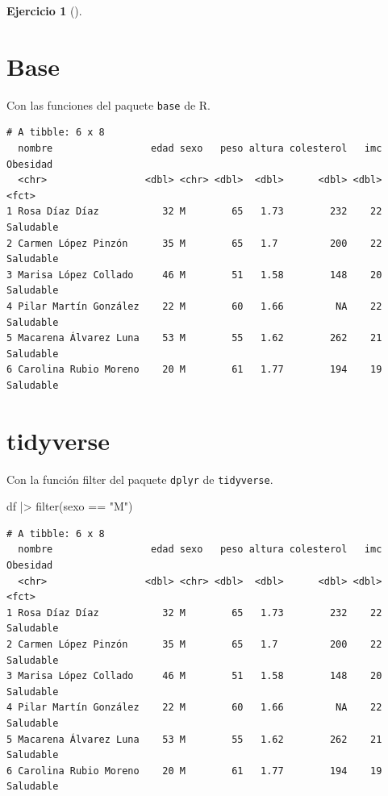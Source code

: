 \documentclass[
  spanish,
  a4paper,
]{scrreport}
\newenvironment{Shaded}{\begin{snugshade}}{\end{snugshade}}
\newcommand{\FunctionTok}[1]{\textcolor[rgb]{0.28,0.35,0.67}{#1}}
\newcommand{\NormalTok}[1]{\textcolor[rgb]{0.00,0.23,0.31}{#1}}
\newcommand{\SpecialCharTok}[1]{\textcolor[rgb]{0.37,0.37,0.37}{#1}}
\newcommand{\StringTok}[1]{\textcolor[rgb]{0.13,0.47,0.30}{#1}}
\theoremstyle{definition}
\newtheorem{exercise}{Ejercicio}[chapter]
\theoremstyle{remark}
\begin{document}
\begin{exercise}[]
\begin{enumerate}
\begin{tcolorbox}
  \section{Base}

  Con las funciones del paquete \texttt{base} de R.

\begin{Shaded}
\end{Shaded}

\begin{verbatim}
# A tibble: 6 x 8
  nombre                 edad sexo   peso altura colesterol   imc Obesidad 
  <chr>                 <dbl> <chr> <dbl>  <dbl>      <dbl> <dbl> <fct>    
1 Rosa Díaz Díaz           32 M        65   1.73        232    22 Saludable
2 Carmen López Pinzón      35 M        65   1.7         200    22 Saludable
3 Marisa López Collado     46 M        51   1.58        148    20 Saludable
4 Pilar Martín González    22 M        60   1.66         NA    22 Saludable
5 Macarena Álvarez Luna    53 M        55   1.62        262    21 Saludable
6 Carolina Rubio Moreno    20 M        61   1.77        194    19 Saludable
\end{verbatim}

  \section{tidyverse}

  Con la función filter del paquete \texttt{dplyr} de
  \texttt{tidyverse}.

\begin{Shaded}
\begin{Highlighting}[]
\NormalTok{df }\SpecialCharTok{|\textgreater{}} \FunctionTok{filter}\NormalTok{(sexo }\SpecialCharTok{==} \StringTok{"M"}\NormalTok{)}
\end{Highlighting}
\end{Shaded}

\begin{verbatim}
# A tibble: 6 x 8
  nombre                 edad sexo   peso altura colesterol   imc Obesidad 
  <chr>                 <dbl> <chr> <dbl>  <dbl>      <dbl> <dbl> <fct>    
1 Rosa Díaz Díaz           32 M        65   1.73        232    22 Saludable
2 Carmen López Pinzón      35 M        65   1.7         200    22 Saludable
3 Marisa López Collado     46 M        51   1.58        148    20 Saludable
4 Pilar Martín González    22 M        60   1.66         NA    22 Saludable
5 Macarena Álvarez Luna    53 M        55   1.62        262    21 Saludable
6 Carolina Rubio Moreno    20 M        61   1.77        194    19 Saludable
\end{verbatim}


\end{tcolorbox}
\end{enumerate}
\end{exercise}
\end{document}
